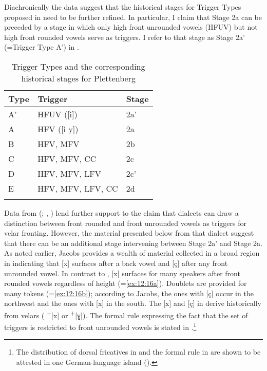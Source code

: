 Diachronically the  data suggest that the historical stages for Trigger Types proposed in  need to be further refined. In particular, I claim that Stage 2a can be preceded by a stage in which only high front unrounded vowels (HFUV) but not high front rounded vowels serve as triggers. I refer to that stage as Stage 2a' (=Trigger Type A') in .\largerpage

\begin{table}
\caption{Trigger Types and the corresponding historical stages for Plettenberg\label{tab:12.27}}
\begin{tabular}{lll}
\lsptoprule
Type & Trigger & Stage\\\midrule
A' & HFUV ([i]) & 2a'\\
A & HFV ([i y]) & 2a\\
B & HFV, MFV & 2b\\
C & HFV, MFV, CC & 2c\\
D & HFV, MFV, LFV & 2c'\\
E & HFV, MFV, LFV, CC & 2d\\
\lspbottomrule
\end{tabular}
\end{table}


Data from  (\citealt{Jacobs1925a, Jacobs1925b, Jacobs1926}; , ) lend further support to the claim that dialects can draw a distinction between front rounded and front unrounded vowels as triggers for velar fronting. However, the material presented below from that dialect suggest that there can be an additional stage intervening between Stage 2a{}' and Stage 2a. As noted earlier, Jacobs provides a wealth of material collected in a broad region in  indicating that [x] surfaces after a back vowel and [ç] after any front unrounded vowel. In contrast to , [x] surfaces for many speakers after front rounded vowels regardless of height (=\ref{ex:12:16a}). Doublets are provided for many tokens (=\ref{ex:12:16b}); according to Jacobs, the ones with [ç] occur in the northwest and the ones with [x] in the south. The [x] and [ç] in  derive historically from velars ( \textsuperscript{+}[x] or \textsuperscript{+}[ɣ]). The formal rule expressing the fact that the set of triggers is restricted to front unrounded vowels is stated in .\footnote{The distribution of dorsal fricatives in  and the formal rule in  are shown to be attested in one German-language island ().}

